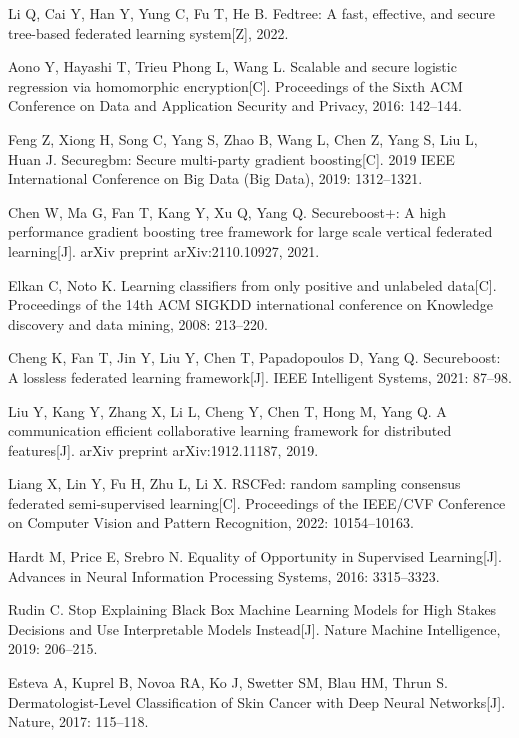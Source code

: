 \begin{thebibliography}{200}
	Li Q, Cai Y, Han Y, Yung C, Fu T, He B. Fedtree: A fast, effective, and secure tree-based federated learning system[Z], 2022.
	
	Aono Y, Hayashi T, Trieu Phong L, Wang L. Scalable and secure logistic regression via homomorphic encryption[C]. Proceedings of the Sixth ACM Conference on Data and Application Security and Privacy, 2016: 142--144.
	
	Feng Z, Xiong H, Song C, Yang S, Zhao B, Wang L, Chen Z, Yang S, Liu L, Huan J. Securegbm: Secure multi-party gradient boosting[C]. 2019 IEEE International Conference on Big Data (Big Data), 2019: 1312--1321.
	
	Chen W, Ma G, Fan T, Kang Y, Xu Q, Yang Q. Secureboost+: A high performance gradient boosting tree framework for large scale vertical federated learning[J]. arXiv preprint arXiv:2110.10927, 2021.
	
	Elkan C, Noto K. Learning classifiers from only positive and unlabeled data[C]. Proceedings of the 14th ACM SIGKDD international conference on Knowledge discovery and data mining, 2008: 213--220.
	
	Cheng K, Fan T, Jin Y, Liu Y, Chen T, Papadopoulos D, Yang Q. Secureboost: A lossless federated learning framework[J]. IEEE Intelligent Systems, 2021: 87--98.
	
	Liu Y, Kang Y, Zhang X, Li L, Cheng Y, Chen T, Hong M, Yang Q. A communication efficient collaborative learning framework for distributed features[J]. arXiv preprint arXiv:1912.11187, 2019.
	
	Liang X, Lin Y, Fu H, Zhu L, Li X. RSCFed: random sampling consensus federated semi-supervised learning[C]. Proceedings of the IEEE/CVF Conference on Computer Vision and Pattern Recognition, 2022: 10154--10163.
	
	Hardt M, Price E, Srebro N. Equality of Opportunity in Supervised Learning[J]. Advances in Neural Information Processing Systems, 2016: 3315--3323.
	
	Rudin C. Stop Explaining Black Box Machine Learning Models for High Stakes Decisions and Use Interpretable Models Instead[J]. Nature Machine Intelligence, 2019: 206--215.
	
	Esteva A, Kuprel B, Novoa RA, Ko J, Swetter SM, Blau HM, Thrun S. Dermatologist-Level Classification of Skin Cancer with Deep Neural Networks[J]. Nature, 2017: 115--118.
	

\end{thebibliography}
